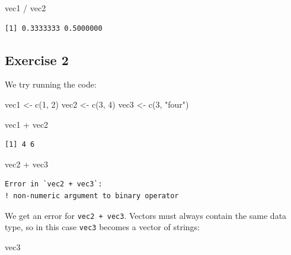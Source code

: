 \documentclass[
  letterpaper,
  DIV=11,
  numbers=noendperiod]{scrreprt}
\newenvironment{Shaded}{\begin{snugshade}}{\end{snugshade}}
\newcommand{\DecValTok}[1]{\textcolor[rgb]{0.68,0.00,0.00}{#1}}
\newcommand{\FunctionTok}[1]{\textcolor[rgb]{0.28,0.35,0.67}{#1}}
\newcommand{\NormalTok}[1]{\textcolor[rgb]{0.00,0.23,0.31}{#1}}
\newcommand{\OtherTok}[1]{\textcolor[rgb]{0.00,0.23,0.31}{#1}}
\newcommand{\SpecialCharTok}[1]{\textcolor[rgb]{0.37,0.37,0.37}{#1}}
\newcommand{\StringTok}[1]{\textcolor[rgb]{0.13,0.47,0.30}{#1}}
\begin{document}
\begin{Shaded}
\begin{Highlighting}[]
\NormalTok{vec1 }\SpecialCharTok{/}\NormalTok{ vec2}
\end{Highlighting}
\end{Shaded}

\begin{verbatim}
[1] 0.3333333 0.5000000
\end{verbatim}

\subsection{Exercise 2}\label{exercise-2-1}

We try running the code:

\begin{Shaded}
\begin{Highlighting}[]
\NormalTok{vec1 }\OtherTok{\textless{}{-}} \FunctionTok{c}\NormalTok{(}\DecValTok{1}\NormalTok{, }\DecValTok{2}\NormalTok{)}
\NormalTok{vec2 }\OtherTok{\textless{}{-}} \FunctionTok{c}\NormalTok{(}\DecValTok{3}\NormalTok{, }\DecValTok{4}\NormalTok{)}
\NormalTok{vec3 }\OtherTok{\textless{}{-}} \FunctionTok{c}\NormalTok{(}\DecValTok{3}\NormalTok{, }\StringTok{"four"}\NormalTok{)}

\NormalTok{vec1 }\SpecialCharTok{+}\NormalTok{ vec2}
\end{Highlighting}
\end{Shaded}

\begin{verbatim}
[1] 4 6
\end{verbatim}

\begin{Shaded}
\begin{Highlighting}[]
\NormalTok{vec2 }\SpecialCharTok{+}\NormalTok{ vec3}
\end{Highlighting}
\end{Shaded}

\begin{verbatim}
Error in `vec2 + vec3`:
! non-numeric argument to binary operator
\end{verbatim}

We get an error for \texttt{vec2\ +\ vec3}. Vectors must always contain
the same data type, so in this case \texttt{vec3} becomes a vector of
strings:

\begin{Shaded}
\begin{Highlighting}[]
\NormalTok{vec3}
\end{Highlighting}
\end{Shaded}
\end{document}
